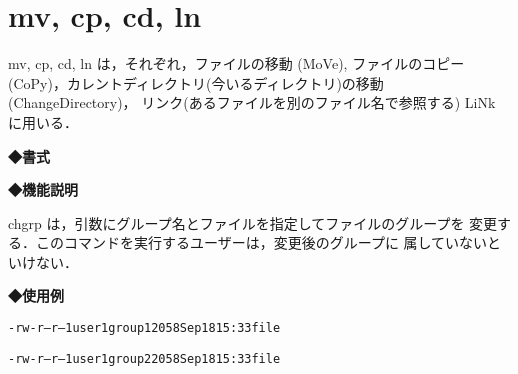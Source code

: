 
\section{mv, cp, cd, ln}
mv, cp, cd, ln は，それぞれ，ファイルの移動 (MoVe), ファイルのコピー
(CoPy)，カレントディレクトリ(今いるディレクトリ)の移動 (ChangeDirectory)，
リンク(あるファイルを別のファイル名で参照する) LiNk に用いる．

\label{cmd:cp}
\noindent
{\bf ◆書式}
\begin{center}
\begin{screen}
\begin{alltt}
% mv 古いファイル名 新しいファイル名
% cp 元ファイル名 コピーのファイル名
% cd 移動先ディレクトリ
% ln -s 元ファイル名 別名
\end{alltt}
\end{screen}
\end{center}

\noindent
{\bf ◆機能説明}

chgrp は，引数にグループ名とファイルを指定してファイルのグループを
変更する．このコマンドを実行するユーザーは，変更後のグループに
属していないといけない．

\noindent
{\bf ◆使用例}
\begin{center}
\begin{breakbox}
\begin{alltt}
% \underline{ls -l file}  （←fileの詳細な情報を表示する）
-rw-r--r--   1 user1   group1  2058 Sep 18 15:33 file

% \underline{chgrp  group2 file}  （←fileの所属するグループをgroup2に変更する）
% \underline{ls -l file}
-rw-r--r--   1 user1   group2  2058 Sep 18 15:33 file
%
\end{alltt}
\end{breakbox}
\end{center}
\clearpage
